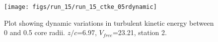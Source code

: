 \begin{figure}[H]
\centering
\texttt{[image: figs/run\_15/run\_15\_ctke\_05rdynamic]}
\caption{Plot showing dynamic variations in turbulent kinetic energy between 0 and 0.5 core radii. $z/c$=6.97, $V_{free}$=23.21, station 2.}
\label{fig:run_15_ctke_05rdynamic}
\end{figure}


